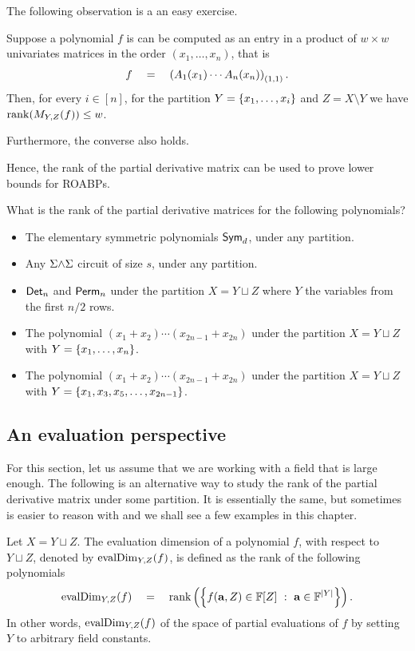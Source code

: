 \noindent
The following observation is a an easy exercise. 

\begin{lemma}
Suppose a polynomial $f$ is can be computed as an entry in a product of $w\times w$ univariates matrices in the order $(x_1,\ldots, x_n)$, that is
\[
f \quad = \quad \left(A_1(x_1) \cdots A_n(x_n) \right)_{(1,1)}.
\]
Then, for every $i \in [n]$, for the partition $Y = \left\{x_1, \ldots , x_{i}\right\}$ and $Z = X \setminus Y$ we have $\operatorname{rank}(M_{Y,Z}(f)) \leq w$. 

Furthermore, the converse also holds. 
\end{lemma}

Hence, the rank of the partial derivative matrix can be used to prove lower bounds for ROABPs. \\

\begin{exercise}\label{ex:pdm-rank}
What is the rank of the partial derivative matrices for the following polynomials? 
\begin{itemize}
\item The elementary symmetric polynomials $\operatorname{\mathsf{Sym}}_d$, under any partition.
\item Any $\Sigma\mathord{\wedge}\Sigma$ circuit of size $s$, under any partition.
\item $\operatorname{\mathsf{Det}}_n$ and $\operatorname{\mathsf{Perm}}_n$ under the partition $X = Y \sqcup Z$ where $Y$ the variables from the first $n/2$ rows. 
\item The polynomial $(x_1 + x_2) \cdots (x_{2n-1} + x_{2n})$ under the partition $X = Y \sqcup Z$ with $Y = \left\{x_1,\ldots, x_n\right\}$. 
\item The polynomial $(x_1 + x_2) \cdots (x_{2n-1} + x_{2n})$ under the partition $X = Y \sqcup Z$ with $Y = \left\{x_1,x_3,x_5,\ldots, x_{2n-1}\right\}$. 
\end{itemize}
\end{exercise}

\subsection{An evaluation perspective}

For this section, let us assume that we are working with a field that is large enough. The following is an alternative way to study the rank of the partial derivative matrix under some partition. It is essentially the same, but sometimes is easier to reason with and we shall see a few examples in this chapter. 

\begin{definition}
Let $X = Y \sqcup Z$. The evaluation dimension of a polynomial $f$, with respect to $Y \sqcup Z$, denoted by $\operatorname{evalDim}_{Y,Z}(f)$,  is defined as the rank of the following polynomials
\[
\operatorname{evalDim}_{Y,Z}(f) \quad = \quad \operatorname{rank}\left(\left\{{f(\mathbf{a}, Z) \in \mathbb{F}[Z]}\ : \ {\mathbf{a} \in \mathbb{F}^{|Y|}}\right\}\right). 
\]
In other words, $\operatorname{evalDim}_{Y,Z}(f)$ of the space of partial evaluations of $f$ by setting $Y$ to arbitrary field constants. 
\end{definition}

